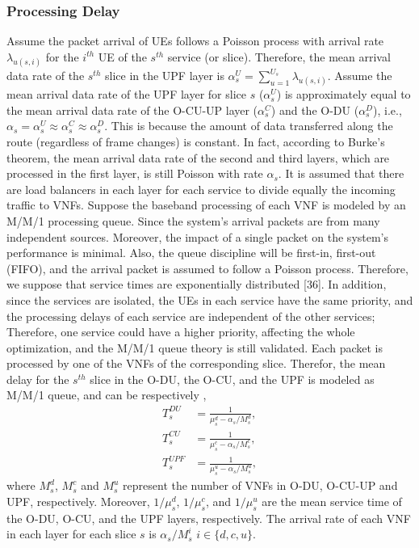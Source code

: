 \documentclass[lettersize,journal]{IEEEtran}
\begin{document}
\subsubsection{Processing Delay}
Assume the packet arrival of UEs follows a Poisson process with arrival rate $\lambda_{u(s,i)}$ for the $i^{th}$ UE of the $s^{th}$ service (or slice).
Therefore, the mean arrival data rate of the $s^{th}$ slice in the UPF layer is $\alpha_{s}^U = \sum_{u=1}^{U_s}\lambda_{u(s,i)}$.
Assume the mean arrival data rate of the UPF layer for slice $s$ ($\alpha_{s}^U$) is approximately equal to the mean arrival data rate of the O-CU-UP layer ($\alpha_{s}^C$) and the O-DU ($\alpha_{s}^D$), i.e., $\alpha_{s} =\alpha_{s}^U \approx \alpha_{s}^C \approx \alpha_{s}^D$. This is because the amount of data transferred along the route (regardless of frame changes) is constant.
In fact, according to Burke’s theorem, the mean arrival data rate of the second and third layers, which are processed in the first layer, is still Poisson with rate $\alpha_{s}$.
It is assumed that there are load balancers in each layer for each service to divide equally the incoming traffic to VNFs. %
Suppose the baseband processing of each VNF is modeled by an M/M/1 processing queue.
Since the system's arrival packets are from many independent sources. Moreover, the impact of a single packet on the system's performance is minimal. Also, the queue discipline will be first-in, first-out (FIFO), and the arrival packet is assumed to follow a Poisson process. Therefore, we suppose that service times are exponentially distributed [36]. In addition, since the services are isolated, the UEs in each service have the same priority, and the processing delays of each service are independent of the other services; Therefore, one service could have a higher priority, affecting the whole optimization, and the M/M/1 queue theory is still validated.
Each packet is processed by one of the VNFs of the corresponding slice. Therefor, the mean delay for the $s^{th}$ slice in the O-DU, the O-CU, and the UPF is modeled as M/M/1 queue, and can be respectively \cite{SystemCostMinimization,luong2018joint,luong2018novel},
\begin{align}
T_{s}^{DU} &= \frac{1}{\mu_s^d - \alpha_{s}/{M_s^{d}}},\\
T_{s}^{CU} &= \frac{1}{\mu_s^c - \alpha_{s}/{M_s^{c}}},\\
T_{s}^{UPF} &= \frac{1}{\mu_s^u - \alpha_{s}/{M_s^{u}}},
\end{align}
where $M_s^{d}$, $M_s^{c}$ and
$M_s^{u}$ represent the number of VNFs in O-DU, O-CU-UP and UPF, respectively.
Moreover, $1/\mu_s^d$, $1/\mu_s^c$, and $1/\mu_s^u$ are the mean service time of the O-DU, O-CU, and the UPF layers, respectively. The arrival rate of each VNF in each layer for each slice
$s$ is $\alpha_{s}/{M_s^{i}}$ $ i \in \{d,c, u\}$.
\end{document}
